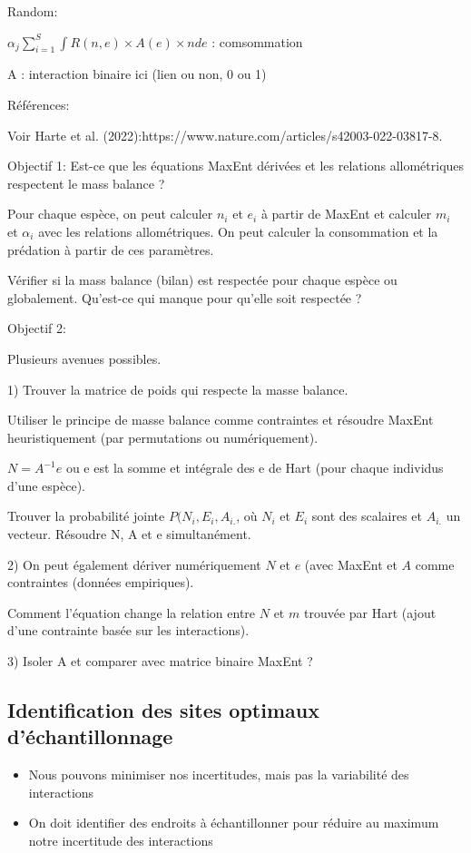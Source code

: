 Random:

$\alpha_j \sum_{i = 1}^{S} \int R(n, e) \times A(e) \times n de$ : comsommation 

A : interaction binaire ici (lien ou non, 0 ou 1)

Références:

Voir Harte et al. (2022):https://www.nature.com/articles/s42003-022-03817-8.

Objectif 1: Est-ce que les équations MaxEnt dérivées et les relations allométriques
respectent le mass balance ? 

Pour chaque espèce, on peut calculer $n_i$ et $e_i$ à partir de MaxEnt et
calculer $m_i$ et $\alpha_i$ avec les relations allométriques. On peut calculer
la consommation et la prédation à partir de ces paramètres. 

Vérifier si la mass balance (bilan) est respectée pour chaque espèce ou
globalement. Qu'est-ce qui manque pour qu'elle soit respectée ? 


Objectif 2: 

Plusieurs avenues possibles. 

1) Trouver la matrice de poids qui respecte la masse balance. 

Utiliser le principe de masse balance comme contraintes et résoudre MaxEnt
heuristiquement (par permutations ou numériquement). 

$N = A^{-1} e$ ou e est la somme et intégrale des e de Hart (pour chaque
individus d'une espèce). 

Trouver la probabilité jointe $P(N_i, E_i, A_{i.}$, où $N_i$ et $E_i$ sont des
scalaires et $A_{i.}$ un vecteur. Résoudre N, A et e simultanément. 

2) On peut également dériver numériquement $N$ et $e$ (avec MaxEnt et $A$ comme
contraintes (données empiriques). 

Comment l'équation change la relation entre $N$ et $m$ trouvée par Hart (ajout
d'une contrainte basée sur les interactions). 

3) Isoler A et comparer avec matrice binaire MaxEnt ?


\subsection{Identification des sites optimaux d'échantillonnage} 

\begin{itemize}
    \item Nous pouvons minimiser nos incertitudes, mais pas la variabilité des interactions
    \item On doit identifier des endroits à échantillonner pour réduire au maximum notre incertitude des interactions
\end{itemize}


